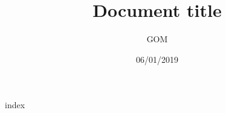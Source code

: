 \documentclass[a4paper]{report}
\title{Document title}
\author{GOM}
\date{06/01/2019}
\begin{document}



\tableofcontents










{index}
\end{document}
